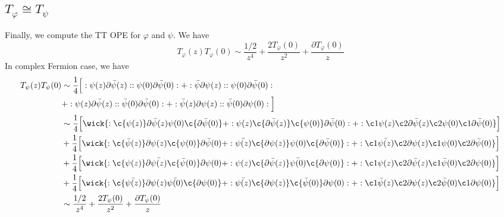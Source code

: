 \subsection{$T_\varphi \cong T_\psi$}
Finally, we compute the TT OPE for $\varphi$ and $\psi$. We have
\[
T_\varphi(z) T_\varphi(0) \sim \frac{1/2}{z^4} + \frac{2T_\varphi(0)}{z^2} + \frac{\partial T_\varphi(0)}{z}
\]
In complex Fermion case, we have
\[
\begin{aligned}
T_\psi(z) T_\psi(0) &\sim \frac{1}{4} \Big[: \psi(z) \partial \bar{\psi} (z):: \psi(0) \partial\bar{\psi}(0): + : \bar{\psi}\partial \psi(z):: \psi(0) \partial\bar{\psi}(0):\\
& + :\psi(z)\partial\bar{\psi}(z):: \bar{\psi}(0) \partial\bar{\psi}(0): + : \bar{\psi}(z)\partial\psi(z)::\bar{\psi}(0) \partial\psi(0):\Big]\\
& \sim \frac{1}{4}\Big[\wick{:\c{\psi(z)} \partial\bar{\psi}(z)\psi(0)\c{\partial\bar{\psi}(0)}+: \psi(z)\c{\partial\bar{\psi}(z)} \c{\psi(0)} \partial\bar{\psi}(0): + : \c1{\psi(z)}\c2{\partial\bar{\psi}(z)} \c2{\psi(0)} \c1{\partial\bar{\psi}(0)} } \Big]\\
&+\frac{1}{4}\Big[\wick{:\c{\bar\psi(z)} \partial\psi(z)\c{\psi(0)}\partial\bar{\psi}(0)+: \bar{\psi(z)}\c{\partial\psi(z)} \psi(0) \c{\partial\bar{\psi}(0)}: + : \c1{\bar{\psi(z)}}\c2{\partial\psi(z)} \c1{\psi(0)} \c2{\partial\bar{\psi}(0)} } \Big]\\
&+\frac{1}{4}\Big[\wick{:\c{\psi(z)} \partial\bar{\psi(z)}\c{\bar\psi(0)}\partial\psi(0)+: \psi(z)\c{\partial\bar\psi(z)} \bar{\psi(0)} \c{\partial\psi(0)}: + : \c1{\psi(z)}\c2{\partial\bar\psi(z)} \c1{\bar\psi(0)} \c2{\partial\psi(0)} } \Big]\\
&+\frac{1}{4}\Big[\wick{:\c{\bar{\psi(z)}} \partial\psi(z)\bar{\psi(0)}\c{\partial\psi(0)}+: \bar{\psi(z)}\c{\partial\psi(z)} \c{\bar\psi(0)} \partial\psi(0): + : \c1{\bar\psi(z)}\c2{\partial\psi(z)} \c2{\bar\psi(0)} \c1{\partial\psi(0)} } \Big]\\
&\sim \frac{1/2}{z^4} + \frac{2T_\psi(0)}{z^2}+ \frac{\partial T_\psi(0)}{z}
\end{aligned}
\]
